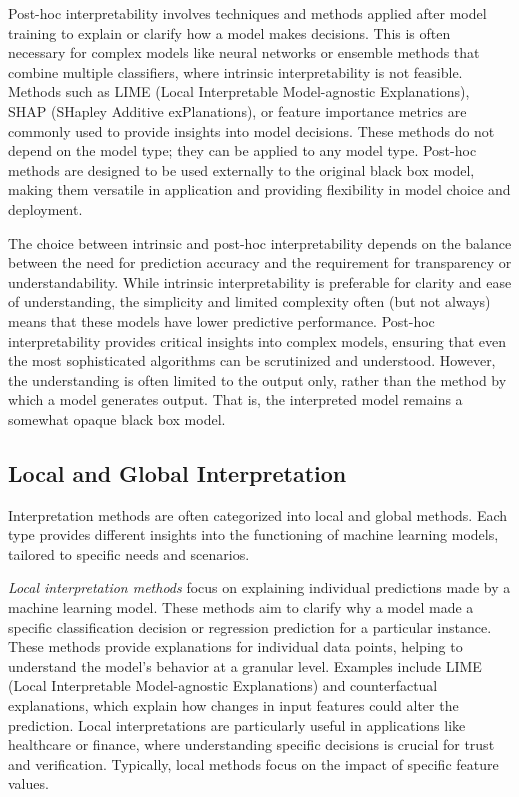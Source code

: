 Post-hoc interpretability involves techniques and methods applied after model training to explain or clarify how a model makes decisions. This is often necessary for complex models like neural networks or ensemble methods that combine multiple classifiers, where intrinsic interpretability is not feasible. Methods such as LIME (Local Interpretable Model-agnostic Explanations), SHAP (SHapley Additive exPlanations), or feature importance metrics are commonly used to provide insights into model decisions. These methods do not depend on the model type; they can be applied to any model type. Post-hoc methods are designed to be used externally to the original black box model, making them versatile in application and providing flexibility in model choice and deployment.

The choice between intrinsic and post-hoc interpretability depends on the balance between the need for prediction accuracy and the requirement for transparency or understandability. While intrinsic interpretability is preferable for clarity and ease of understanding, the simplicity and limited complexity often (but not always) means that these models have lower predictive performance. Post-hoc interpretability provides critical insights into complex models, ensuring that even the most sophisticated algorithms can be scrutinized and understood. However, the understanding is often limited to the output only, rather than the method by which a model generates output. That is, the interpreted model remains a somewhat opaque black box model.

\subsection*{Local and Global Interpretation}

Interpretation methods are often categorized into local and global methods. Each type provides different insights into the functioning of machine learning models, tailored to specific needs and scenarios.

\emph{Local interpretation methods} focus on explaining individual predictions made by a machine learning model. These methods aim to clarify why a model made a specific classification decision or regression prediction for a particular instance. These methods provide explanations for individual data points, helping to understand the model's behavior at a granular level. Examples include LIME (Local Interpretable Model-agnostic Explanations) and counterfactual explanations, which explain how changes in input features could alter the prediction. Local interpretations are particularly useful in applications like healthcare or finance, where understanding specific decisions is crucial for trust and verification. Typically, local methods focus on the impact of specific feature values.

